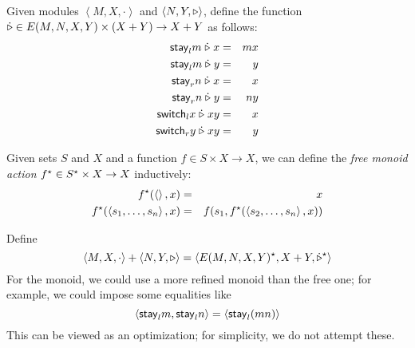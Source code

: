 \begin{defn}[$R$-similarity]
\begin{theorem}
\begin{lemma}
\begin{theorem}[No products]
\begin{lemma}
\begin{defn}
\begin{theorem}
\begin{theorem}
\begin{corollary}[Hylomorphism]
\begin{defn}
\begin{defn}
\begin{defn}[Symmetrization]
\begin{theorem}
\begin{definition}
Given modules $\left<M,X,\cdot\right>$ and $\left<N,Y,\triangleright\right>$, define
the function $\dot{\triangleright} \in E(M,N,X,Y) \times (X + Y) \to X + Y$ as follows:
\begin{eqnarray*}
    \mathsf{stay}_lm \mathrel{\dot{\triangleright}}  x &=&  mx \\
    \mathsf{stay}_lm \mathrel{\dot{\triangleright}}  y &=&  y \\
    \mathsf{stay}_rn \mathrel{\dot{\triangleright}}  x &=&  x \\
    \mathsf{stay}_rn \mathrel{\dot{\triangleright}}  y &=&  ny \\
    \mathsf{switch}_lx \mathrel{\dot{\triangleright}} xy &=&  x \\
    \mathsf{switch}_ry \mathrel{\dot{\triangleright}} xy &=&  y
\end{eqnarray*}
\end{definition}

\begin{definition}
Given sets $S$ and $X$ and a function $f \in S \times X \to X$, we can define
the \emph{free monoid action} $f^\star \in S^\star \times X \to X$ inductively:
\begin{eqnarray*}
    f^\star(\left<\right>,x) &=& x \\
    f^\star(\left<s_1,\ldots,s_n\right>,x) &=& f(s_1,f^\star(\left<s_2,\ldots,s_n\right>,x))
\end{eqnarray*}
\end{definition}

\begin{definition}
Define
\[\left<M,X,\cdot\right>+\left<N,Y,\triangleright\right> =
\left<E(M,N,X,Y)^\star,X+Y,\dot{\triangleright}^\star\right>\]
For the monoid, we could use a more refined monoid than the free one; for
example, we could impose some equalities like
\[\left<\mathsf{stay}_lm,\mathsf{stay}_ln\right> = \left<\mathsf{stay}_l(mn)\right>\]
This can be viewed as an optimization; for simplicity, we do not attempt
these.
\end{definition}


\end{theorem}
\end{defn}
\end{defn}
\end{defn}
\end{corollary}
\end{theorem}
\end{theorem}
\end{defn}
\end{lemma}
\end{theorem}
\end{lemma}
\end{theorem}
\end{defn}
